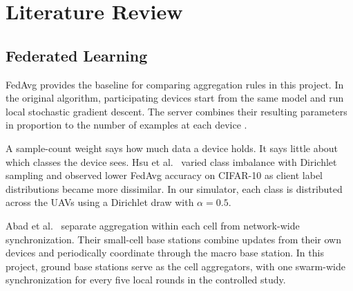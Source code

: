 \chapter{Literature Review}
\label{ch:lit}

\section{Federated Learning}
FedAvg provides the baseline for comparing aggregation rules in this project.
In the original algorithm, participating devices start from the same model and run
local stochastic gradient descent. The server combines their resulting parameters
in proportion to the number of examples at each device
\cite{mcmahan2017fedavg}.

A sample-count weight says how much data a device holds. It says little about which
classes the device sees. Hsu et al.~\cite{hsu2019noniid} varied class imbalance
with Dirichlet sampling and observed lower FedAvg accuracy on CIFAR-10 as client
label distributions became more dissimilar. In our simulator, each class is
distributed across the UAVs using a Dirichlet draw with $\alpha=0.5$.

Abad et al.~\cite{abad2020hfl} separate aggregation within each cell from
network-wide synchronization. Their small-cell base stations combine updates from
their own devices and periodically coordinate through the macro base station.
In this project, ground base stations serve as the cell aggregators, with one
swarm-wide synchronization for every five local rounds in the controlled study.

